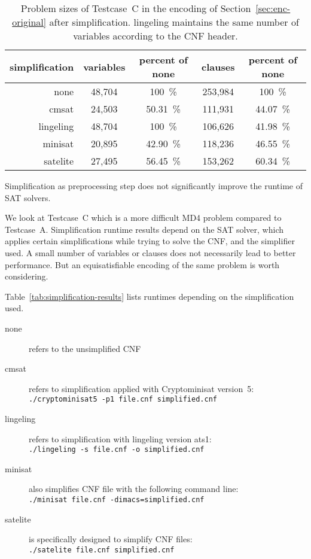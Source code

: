 \begin{table}[!h]
  \begin{center}
    \begin{tabular}{rcccc}
      \textbf{simplification} & \textbf{variables} & \textbf{percent of none} &\textbf{clauses} & \textbf{percent of none} \\
    \hline
           none &    48,704 & 100~\%   & 253,984 & 100~\% \\
          cmsat &    24,503 & 50.31~\% & 111,931 & 44.07~\% \\
      lingeling &    48,704 & 100~\%   & 106,626 & 41.98~\% \\
        minisat &    20,895 & 42.90~\% & 118,236 & 46.55~\% \\
       satelite &    27,495 & 56.45~\% & 153,262 & 60.34~\%
    \end{tabular}
    \caption{
        Problem sizes of Testcase~C in the encoding of
        Section~\ref{sec:enc-original} after simplification.
        lingeling maintains the same number of variables
        according to the CNF header.
    }
    \label{tab:simpl-size}
  \end{center}
\end{table}

\begin{prop}
  Simplification as preprocessing step does not significantly improve the runtime of SAT solvers.
\end{prop}
%
We look at Testcase~C which is a more difficult MD4 problem
compared to Testcase~A. Simplification runtime results depend on the
SAT solver, which applies certain simplifications while trying to solve the
CNF, and the simplifier used. A small number of variables or clauses does
not necessarily lead to better performance. But an equisatisfiable encoding
of the same problem is worth considering.

Table~\ref{tab:simplification-results} lists runtimes depending
on the simplification used.

\begin{description}
\item[none]
  refers to the unsimplified CNF
\item[cmsat]
  refers to simplification applied with Cryptominisat version~5: \\
  \texttt{./cryptominisat5 -p1 file.cnf simplified.cnf}
\item[lingeling]
  refers to simplification with lingeling version ats1: \\
  \texttt{./lingeling -s file.cnf -o simplified.cnf}
\item[minisat]
  also simplifies CNF file with the following command line: \\
  \texttt{./minisat file.cnf -dimacs=simplified.cnf}
\item[satelite]
  is specifically designed to simplify CNF files: \\
  \texttt{./satelite file.cnf simplified.cnf}
\end{description}


